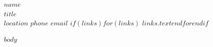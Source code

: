 \documentclass[10pt]{article}
\begin{document}
\begin{center}
  {\huge\bfseries $name$}\\[3pt]
  {\large\color{accent} $title$}\\[4pt]
  $location$ \quad\textbar\quad $phone$ \quad\textbar\quad \href{mailto:$email$}{$email$}%
  $if(links)$$for(links)$ \quad\textbar\quad \href{$links.url$}{$links.text$}$endfor$$endif$
\end{center}
\vspace{4pt}

$body$
\end{document}
